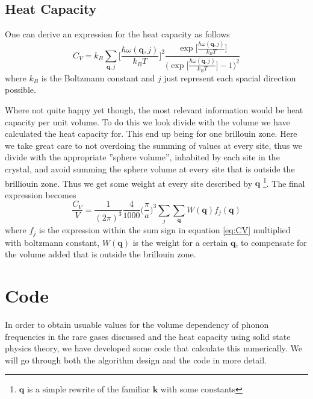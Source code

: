 \documentclass[11pt]{article}
\begin{document}
\subsection{Heat Capacity}
One can derive an expression for the heat capacity as follows\cite{bib:solid}
\begin{equation}
	C_V = k_B \sum_{\mathbf{q}, j} \Big[\frac{\hbar \omega(\mathbf{q},j)}{k_B T}\Big]^2
	\frac{\exp{\Big[\frac{\hbar \omega(\mathbf{q},j)}{k_B T}\Big]}}{\Big(\exp{\Big[\frac{\hbar \omega(\mathbf{q},j)}{k_B T}\Big]}-1\Big)^2}
	\label{eq:CV}
\end{equation}
where $k_B$ is the Boltzmann constant and $j$ just represent each spacial direction possible. 

Where not quite happy yet though, the most relevant information would be heat capacity per unit volume. To do this we look divide with the volume we have calculated the heat capacity for. This end up being for one brillouin zone. Here we take great care to not overdoing the summing of values at every site, thus we divide with the appropriate ''sphere volume'', inhabited by each site in the crystal, and avoid summing the sphere volume at every site that is outside the brilliouin zone. Thus we get some weight at every site described by $\mathbf{q}$ \footnote{$\mathbf{q}$ is a simple rewrite of the familiar $\mathbf{k}$ with some constants}. The final expression becomes
\begin{equation}
	\frac{C_V}{V} = \frac{1}{(2\pi)^3} \frac{4}{1000} \big(\frac{\pi}{a})^3 \sum_j \sum_{\mathbf{q}} W(\mathbf{q})f_j(\mathbf{q}) 
\end{equation}
where $f_j$ is the expression within the sum sign in equation \ref{eq:CV} multiplied with boltzmann constant, $W(\mathbf{q})$ is the weight for a certain $\mathbf{q}$, to compensate for the volume added that is outside the brillouin zone. 



\section{Code}
In order to obtain usuable values for the volume dependency of phonon frequencies in the rare gases discussed and the heat capacity using solid state physics theory, we have developed some code that calculate this numerically. We will go through both the algorithm design and the code in more detail. 
\end{document}
